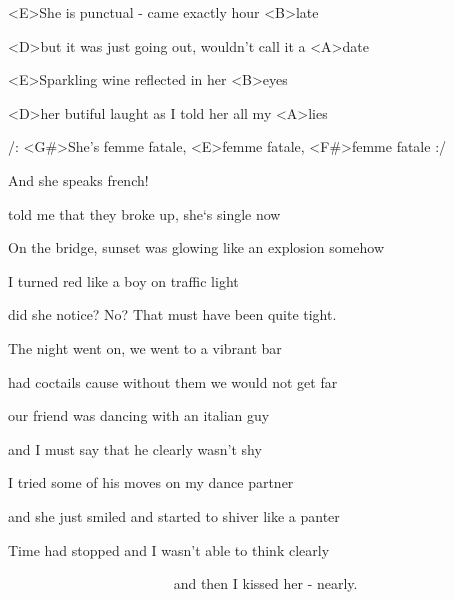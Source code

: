 

\zs
<E>She is punctual - came exactly hour <B>late

<D>but it was just going out, wouldn't call it a <A>date

<E>Sparkling wine reflected in her <B>eyes

<D>her butiful laught as I told her all my <A>lies
\ks

\zr
/: <G#>She’s femme fatale, <E>femme fatale, <F#>femme fatale :/

And she speaks french!
\kr

\zs
told me that they broke up, she‘s single now 

On the bridge, sunset was glowing like an explosion somehow

I turned red like a boy on traffic light

did she notice? No? That must have been quite tight.
\ks

\zr
\kr

\zs
The night went on, we went to a vibrant bar

had coctails cause without them we would not get far

our friend was dancing with an italian guy

and I must say that he clearly wasn't shy
\ks

\zs
I tried some of his moves on my dance partner

and she just smiled and started to shiver like a panter

Time had stopped and I wasn't able to think clearly

~~~~~~~~~~~~~~~~~~~~~~~ and then I kissed her - nearly.
\ks

\zr
\kr

\kp
